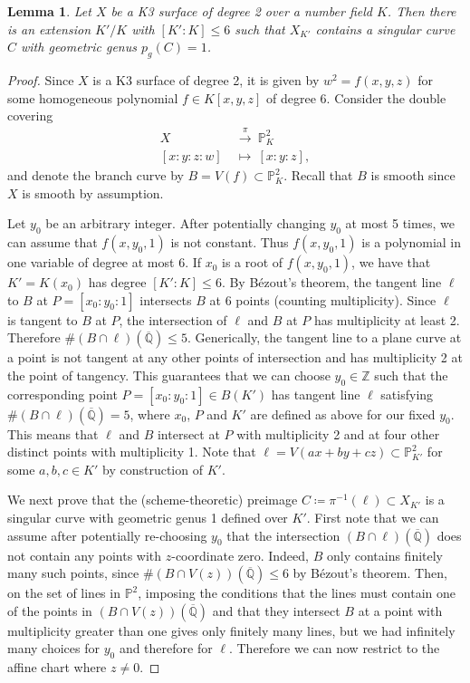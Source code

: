 \documentclass[11pt]{amsart}
\newcommand{\QQ}{\mathbb{Q}}
\newcommand{\ZZ}{\mathbb{Z}}
\newcommand{\PP}{\mathbb{P}}
\theoremstyle{plain}
\newtheorem{lemma}{Lemma}[section]
\theoremstyle{remark}
\begin{document}
\begin{lemma} \label{deg6ext}
Let $X$ be a K3 surface of degree 2 over a number field $K$. Then there is an extension $K'/K$ with $[K': K]\leq 6$ such that $X_{K'}$ contains a singular curve $C$ with geometric genus $p_g(C)=1$. 
\end{lemma}
\begin{proof}
    Since $X$ is a K3 surface of degree 2, it is given by $w^2=f(x,y,z)$ for some homogeneous polynomial $f\in K[x,y,z]$ of degree 6. Consider the double covering
   \begin{align*}
X \ &\xrightarrow{\pi} \ \PP^2_K\\
[x:y:z:w] \ &\mapsto \ [x:y:z],
\end{align*}
and denote the branch curve by $B=V(f)\subset \PP^2_K$. Recall that $B$ is smooth since $X$ is smooth by assumption. 

Let $y_0$ be an arbitrary integer. After potentially changing $y_0$ at most 5 times, we can assume that $f(x,y_0,1)$ is not constant. Thus $f(x,y_0,1)$ is a polynomial in one variable of degree at most 6. If $x_0$ is a root of $f(x,y_0,1)$, we have that $K'=K(x_0)$ has degree $[K':K]\leq 6$. 
By Bézout's theorem, the tangent line $\ell$ to $B$ at $P=[x_0:y_0:1]$ intersects $B$ at 6 points (counting multiplicity). Since $\ell$ is tangent to $B$ at $P$, the intersection of $\ell$ and $B$ at $P$ has multiplicity at least 2. Therefore $\#(B\cap \ell )(\overline{\QQ})\leq 5$. Generically, the tangent line to a plane curve at a point is not tangent at any other points of intersection and has multiplicity 2 at the point of tangency. This guarantees that we can choose $y_0\in \ZZ$ such that the corresponding point $P=[x_0:y_0:1]\in B(K')$ has tangent line $\ell$ satisfying $\#(B\cap \ell)(\overline{\QQ}) = 5$, where $x_0$, $P$ and $K'$ are defined as above for our fixed $y_0$. This means that $\ell$ and $B$ intersect at $P$ with multiplicity 2 and at four other distinct points with multiplicity 1. Note that $\ell=V(ax+by+cz)\subset \PP^2_{K'}$ for some $a,b,c\in K'$ by construction of $K'$. 

We next prove that the (scheme-theoretic) preimage $C\coloneqq \pi^{-1}(\ell)\subset X_{K'}$ is a singular curve with geometric genus 1 defined over $K'$. First note that we can assume after potentially re-choosing $y_0$ that the intersection $(B\cap \ell)(\overline{\QQ})$ does not contain any points with $z$-coordinate zero. Indeed, $B$ only contains finitely many such points, since $\#(B\cap V(z))(\overline{\QQ})\leq 6$ by Bézout's theorem. Then, on the set of lines in $\PP^2$, imposing the conditions that the lines must contain one of the points in $(B\cap V(z))(\overline{\QQ})$ and that they intersect $B$ at a point with multiplicity greater than one gives only finitely many lines, but we had infinitely many choices for $y_0$ and therefore for $\ell$. 
Therefore we can now restrict to the affine chart where $z\neq 0$.


\end{proof}
\end{document}

